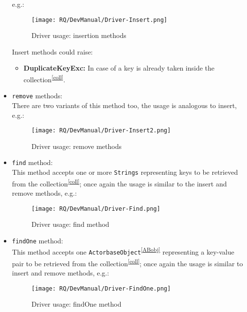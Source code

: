 \documentclass{scalatekids-article}
\begin{document}
\begin{itemize}
  e.g.:
  \begin{figure}[H]
    \begin{center}
      \texttt{[image: RQ/DevManual/Driver-Insert.png]}
      \caption{Driver usage: insertion methods}
    \end{center}
  \end{figure}
  Insert methods could raise:
  \begin{itemize}
  \item \textbf{DuplicateKeyExc:} In case of a key is already taken inside the collection\textsuperscript{\ref{coll}}.
  \end{itemize}
\item \verb=remove= methods:\\ There are two variants of this method too, the usage is
  analogous to insert, e.g.:
  \begin{figure}[H]
    \begin{center}
      \texttt{[image: RQ/DevManual/Driver-Insert2.png]}
      \caption{Driver usage: remove methods}
    \end{center}
  \end{figure}
\item \verb=find= method:\\ This method accepts one or more \verb=Strings= representing
  keys to be retrieved from the collection\textsuperscript{\ref{coll}}; once again the usage is similar to the insert and
  remove methods, e.g.:
  \begin{figure}[H]
    \begin{center}
      \texttt{[image: RQ/DevManual/Driver-Find.png]}
      \caption{Driver usage: find method}
    \end{center}
  \end{figure}
\item \verb=findOne= method:\\ This method accepts one \verb=ActorbaseObject=\textsuperscript{\ref{ABobj}} representing
  a key-value pair to be retrieved from the collection\textsuperscript{\ref{coll}}; once again the usage is similar to insert and
  remove methods, e.g.:
  \begin{figure}[H]
    \begin{center}
      \texttt{[image: RQ/DevManual/Driver-FindOne.png]}
      \caption{Driver usage: findOne method}
    \end{center}
  \end{figure}

\end{itemize}
\end{document}
